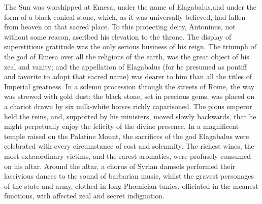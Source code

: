 
The Sun was worshipped at Emesa, under the name of Elagabalus,\footnotemark[52]
and under the form of a black conical stone, which, as it was
universally believed, had fallen from heaven on that sacred
place. To this protecting deity, Antoninus, not without some
reason, ascribed his elevation to the throne. The display of
superstitious gratitude was the only serious business of his
reign. The triumph of the god of Emesa over all the religions of
the earth, was the great object of his zeal and vanity; and the
appellation of Elagabalus (for he presumed as pontiff and
favorite to adopt that sacred name) was dearer to him than all
the titles of Imperial greatness. In a solemn procession through
the streets of Rome, the way was strewed with gold dust; the
black stone, set in precious gems, was placed on a chariot drawn
by six milk-white horses richly caparisoned. The pious emperor
held the reins, and, supported by his ministers, moved slowly
backwards, that he might perpetually enjoy the felicity of the
divine presence. In a magnificent temple raised on the Palatine
Mount, the sacrifices of the god Elagabalus were celebrated with
every circumstance of cost and solemnity. The richest wines, the
most extraordinary victims, and the rarest aromatics, were
profusely consumed on his altar. Around the altar, a chorus of
Syrian damsels performed their lascivious dances to the sound of
barbarian music, whilst the gravest personages of the state and
army, clothed in long Phœnician tunics, officiated in the meanest
functions, with affected zeal and secret indignation.\footnotemark[53]



